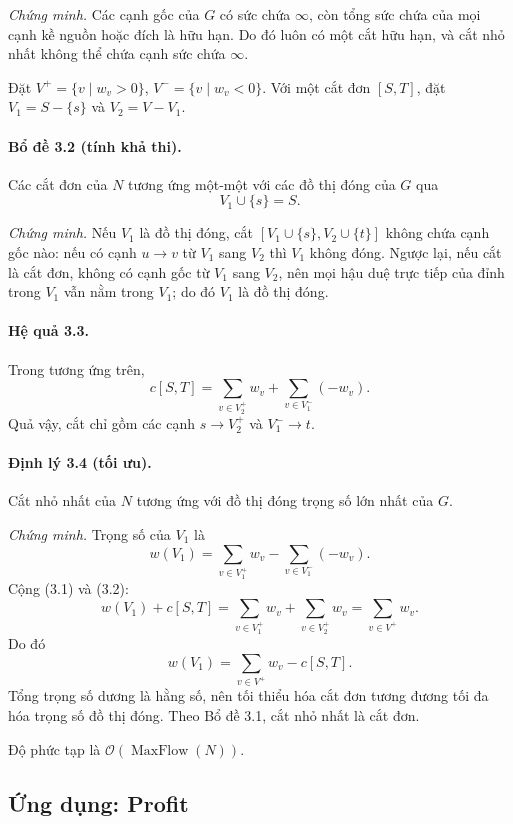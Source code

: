 \documentclass[11pt]{article}
\newcommand{\Oh}{\mathcal{O}}
\newcommand{\INF}{\infty}
\begin{document}
\emph{Chứng minh.}
Các cạnh gốc của \(G\) có sức chứa \(\INF\), còn tổng sức chứa của mọi cạnh
kề nguồn hoặc đích là hữu hạn. Do đó luôn có một cắt hữu hạn, và cắt nhỏ nhất
không thể chứa cạnh sức chứa \(\INF\).

Đặt \(V^+=\{v\mid w_v>0\}\), \(V^-=\{v\mid w_v<0\}\). Với một cắt đơn
\([S,T]\), đặt \(V_1=S-\{s\}\) và \(V_2=V-V_1\).

\paragraph{Bổ đề 3.2 (tính khả thi).}
Các cắt đơn của \(N\) tương ứng một-một với các đồ thị đóng của \(G\) qua
\[
  V_1\cup\{s\}=S.
\]

\emph{Chứng minh.}
Nếu \(V_1\) là đồ thị đóng, cắt \([V_1\cup\{s\}, V_2\cup\{t\}]\) không chứa
cạnh gốc nào: nếu có cạnh \(u\to v\) từ \(V_1\) sang \(V_2\) thì \(V_1\)
không đóng. Ngược lại, nếu cắt là cắt đơn, không có cạnh gốc từ \(V_1\) sang
\(V_2\), nên mọi hậu duệ trực tiếp của đỉnh trong \(V_1\) vẫn nằm trong
\(V_1\); do đó \(V_1\) là đồ thị đóng.

\paragraph{Hệ quả 3.3.}
Trong tương ứng trên,
\[
  c[S,T]=\sum_{v\in V_2^+} w_v+\sum_{v\in V_1^-}(-w_v). \tag{3.1}
\]
Quả vậy, cắt chỉ gồm các cạnh \(s\to V_2^+\) và \(V_1^-\to t\).

\paragraph{Định lý 3.4 (tối ưu).}
Cắt nhỏ nhất của \(N\) tương ứng với đồ thị đóng trọng số lớn nhất của \(G\).

\emph{Chứng minh.}
Trọng số của \(V_1\) là
\[
  w(V_1)=\sum_{v\in V_1^+} w_v-\sum_{v\in V_1^-}(-w_v). \tag{3.2}
\]
Cộng (3.1) và (3.2):
\[
  w(V_1)+c[S,T]
  =\sum_{v\in V_1^+}w_v+\sum_{v\in V_2^+}w_v
  =\sum_{v\in V^+}w_v.
\]
Do đó
\[
  w(V_1)=\sum_{v\in V^+}w_v-c[S,T]. \tag{3.3}
\]
Tổng trọng số dương là hằng số, nên tối thiểu hóa cắt đơn tương đương tối đa
hóa trọng số đồ thị đóng. Theo Bổ đề 3.1, cắt nhỏ nhất là cắt đơn.

Độ phức tạp là \(\Oh(\operatorname{MaxFlow}(N))\).

\subsection{Ứng dụng: Profit}
\end{document}
